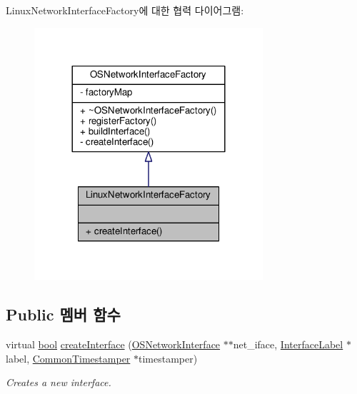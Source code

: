 Linux\+Network\+Interface\+Factory에 대한 협력 다이어그램\+:
\nopagebreak
\begin{figure}[H]
\begin{center}
\leavevmode
\includegraphics[width=240pt]{class_linux_network_interface_factory__coll__graph}
\end{center}
\end{figure}
\subsection*{Public 멤버 함수}
\begin{DoxyCompactItemize}
\item 
virtual \hyperlink{avb__gptp_8h_af6a258d8f3ee5206d682d799316314b1}{bool} \hyperlink{class_linux_network_interface_factory_ad98c21d0fa2f176fa0c8c10ed95f9ab8}{create\+Interface} (\hyperlink{class_o_s_network_interface}{O\+S\+Network\+Interface} $\ast$$\ast$net\+\_\+iface, \hyperlink{class_interface_label}{Interface\+Label} $\ast$label, \hyperlink{class_common_timestamper}{Common\+Timestamper} $\ast$timestamper)
\begin{DoxyCompactList}\small\item\em Creates a new interface. \end{DoxyCompactList}\end{DoxyCompactItemize}
